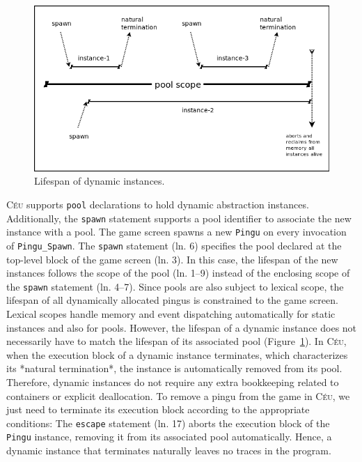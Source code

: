 \documentclass{vgtc}                          %
\newcommand{\CEU}{\textsc{C\'{e}u}\xspace}
\newcommand{\code}[1] {{\small{\texttt{#1}}}}
\begin{document}
\begin{figure}[t]
\centering
\includegraphics[width=\columnwidth]{pool}
\caption{Lifespan of dynamic instances.
\label{fig.pool}
}
\end{figure}

\CEU supports \code{pool} declarations to hold dynamic abstraction instances.
Additionally, the \code{spawn} statement supports a pool identifier to
associate the new instance with a pool.
%
The game screen spawns a new \code{Pingu} on every invocation of
\code{Pingu\_Spawn}.
%
The \code{spawn} statement (ln. 6) specifies the pool declared at the top-level
block of the game screen (ln. 3).
In this case, the lifespan of the new instances follows the scope of the pool
(ln. 1--9) instead of the enclosing scope of the \code{spawn} statement
(ln. 4--7).
Since pools are also subject to lexical scope, the lifespan of all dynamically
allocated pingus is constrained to the game screen.
%
Lexical scopes handle memory and event dispatching automatically for static
instances and also for pools.
However, the lifespan of a dynamic instance does not necessarily have to match
the lifespan of its associated pool (Figure~\ref{fig.pool}).
In \CEU, when the execution block of a dynamic instance terminates, which
characterizes its *natural termination*, the instance is automatically removed
from its pool.
Therefore, dynamic instances do not require any extra bookkeeping related to 
containers or explicit deallocation.
%
To remove a pingu from the game in \CEU, we just need to terminate its execution
block according to the appropriate conditions:
%
The \code{escape} statement (ln. 17) aborts the execution block of the
\code{Pingu} instance, removing it from its associated pool automatically.
Hence, a dynamic instance that terminates naturally leaves no traces in the 
program.
\end{document}
